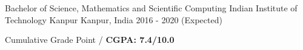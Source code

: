 


\begin{cventries}


\cventry
{Bachelor of Science, Mathematics and Scientific Computing} %
{Indian Institute of Technology Kanpur} %
{Kanpur, India} %
{2016 - 2020 (Expected)} %
{%
\begin{cvitems}
\item {Cumulative Grade Point /
    \textbf{CGPA: 7.4/10.0}}
\end{cvitems}
}

\end{cventries}

